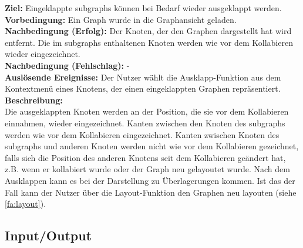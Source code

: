 \label{fa:ausklappen}
\textbf{Ziel:} Eingeklappte \glspl{subgraph} können bei Bedarf wieder ausgeklappt werden.\\
\textbf{Vorbedingung:} Ein Graph wurde in die Graphansicht geladen.\\
\textbf{Nachbedingung (Erfolg):} Der Knoten, der den Graphen dargestellt hat wird entfernt. Die im \glspl{subgraph} enthaltenen Knoten werden wie vor dem Kollabieren wieder eingezeichnet.\\
\textbf{Nachbedingung (Fehlschlag):} -\\
\textbf{Auslösende Ereignisse:} Der Nutzer wählt die Ausklapp-Funktion aus dem Kontextmenü eines Knotens, der einen eingeklappten Graphen repräsentiert.\\
\textbf{Beschreibung:}\\
Die ausgeklappten Knoten werden an der Position, die sie vor dem Kollabieren einnahmen,  wieder eingezeichnet.
Kanten zwischen den Knoten des \glspl{subgraph} werden wie vor dem Kollabieren eingezeichnet.
Kanten zwischen Knoten des \glspl{subgraph} und anderen Knoten werden nicht wie vor dem Kollabieren gezeichnet,
falls sich die Position des anderen Knotens seit dem Kollabieren geändert hat, z.B. wenn er kollabiert wurde oder der Graph neu gelayoutet wurde.
Nach dem Ausklappen kann es bei der Darstellung zu Überlagerungen kommen.
Ist das der Fall kann der Nutzer über die Layout-Funktion den Graphen neu layouten (siehe \ref{fa:layout}).

\subsection{Input/Output}
\setcounter{fanr}{100}

